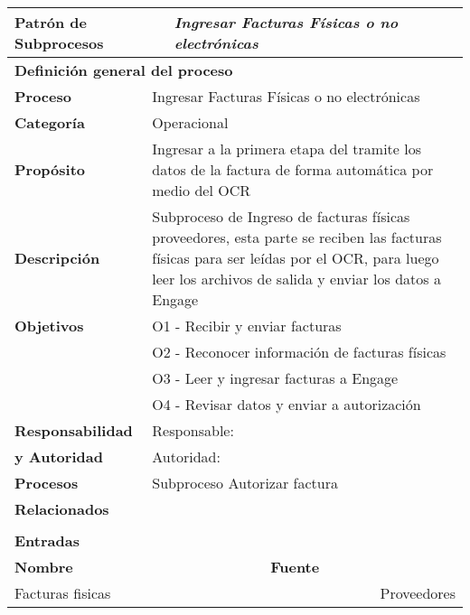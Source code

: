 \begin{longtable}{|llrrrrrr|}
	\hline
	\multicolumn{2}{|l|}{\textbf{Patrón de Subprocesos}} & \multicolumn{6}{|l|}{\textit{Ingresar Facturas Físicas o no electrónicas}} \\ \hline
	\multicolumn{8}{|l|}{\textbf{Definición general del proceso}} \\ \hline
	\textbf{Proceso} & \multicolumn{7}{|m{12cm}|}{Ingresar Facturas Físicas o no electrónicas} \\ \hline
	\textbf{Categoría} & \multicolumn{7}{|m{12cm}|}{Operacional} \\ \hline
	\textbf{Propósito} & \multicolumn{7}{|m{12cm}|}{Ingresar a la primera etapa del tramite los datos de la factura de forma automática por medio del OCR} \\ \hline
    \textbf{Descripción} & \multicolumn{7}{|m{12cm}|}{Subproceso de Ingreso de facturas físicas proveedores, esta parte se reciben las facturas físicas para ser leídas por el OCR, para luego leer los archivos de salida y enviar los datos a Engage} \\ \hline
	\multirow{0}[6]{*}{\textbf{Objetivos}} 
          & \multicolumn{7}{|l|}{O1 - Recibir y enviar facturas } \\ \cline{2-8}
          & \multicolumn{7}{|l|}{O2 - Reconocer información de facturas físicas } \\ \cline{2-8}
          & \multicolumn{7}{|l|}{O3 - Leer y ingresar facturas a Engage} \\ \cline{2-8}
          & \multicolumn{7}{|l|}{O4 - Revisar datos y enviar a autorización } \\ \hline
    \multicolumn{1}{|l|}{\textbf{Responsabilidad}} 	& \multicolumn{7}{|l|}{Responsable: } \\
	\multicolumn{1}{|l|}{\textbf{y Autoridad}} 	& \multicolumn{7}{|l|}{Autoridad: } \\ \hline
    \multicolumn{1}{|l|}{\textbf{Procesos}} 	& \multicolumn{7}{|m{12cm}|}{Subproceso Autorizar factura} \\
	\multicolumn{1}{|l|}{\textbf{Relacionados}} 	&  \multicolumn{7}{|m{12cm}|}{} \\ \hline
          &       &       &       &       &       &       &  \\ \hline
    \multicolumn{8}{|l|}{\textbf{Entradas}} \\ \hline
    \multicolumn{5}{|l|}{\textbf{Nombre}}   & \multicolumn{3}{|l|}{\textbf{Fuente}} \\ \hline
    \multicolumn{5}{|l|}{Facturas fisicas} & \multicolumn{3}{|m{3.5cm}|}{Proveedores} \\  \hline

\end{longtable}
